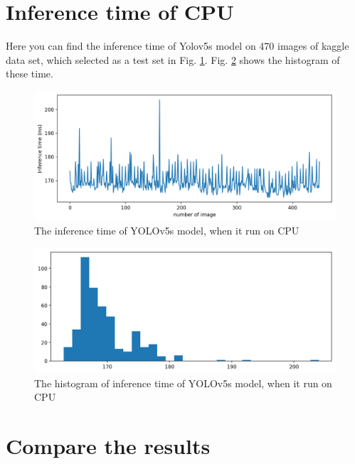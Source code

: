 \documentclass[12pt,a4paper]{article}
\begin{document}
\section*{Inference time of CPU}
Here you can find the inference time of Yolov5s model on 470 images of kaggle data set, which selected as a test set in Fig. \ref{fig: cpu}. Fig. \ref{fig: cpu_hist} shows the histogram of these time.
\begin{figure}[H]
    \centering
    \includegraphics[width=15cm]{figures/CPU_infTime.png}
    \caption{The inference time of YOLOv5s model, when it run on CPU}
    \label{fig: cpu}
\end{figure}
\begin{figure}[H]
    \centering
    \includegraphics[width=15cm]{figures/CPU_infTime_hist.png}
    \caption{The histogram of inference time of YOLOv5s model, when it run on CPU}
    \label{fig: cpu_hist}
\end{figure}

\section*{Compare the results}
\end{document}
